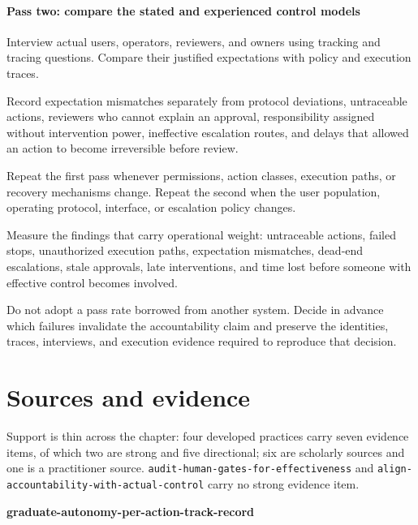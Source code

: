 \hypertarget{pass-two-compare-the-stated-and-experienced-control-models}{%
\paragraph{Pass two: compare the stated and experienced control models}\label{pass-two-compare-the-stated-and-experienced-control-models}}

Interview actual users, operators, reviewers, and owners using tracking and tracing questions. Compare their justified expectations with policy and execution traces.

Record expectation mismatches separately from protocol deviations, untraceable actions, reviewers who cannot explain an approval, responsibility assigned without intervention power, ineffective escalation routes, and delays that allowed an action to become irreversible before review.

Repeat the first pass whenever permissions, action classes, execution paths, or recovery mechanisms change. Repeat the second when the user population, operating protocol, interface, or escalation policy changes.

Measure the findings that carry operational weight: untraceable actions, failed stops, unauthorized execution paths, expectation mismatches, dead-end escalations, stale approvals, late interventions, and time lost before someone with effective control becomes involved.

Do not adopt a pass rate borrowed from another system. Decide in advance which failures invalidate the accountability claim and preserve the identities, traces, interviews, and execution evidence required to reproduce that decision.

\section*{Sources and evidence}

Support is thin across the chapter: four developed practices carry seven evidence items, of which two are strong and five directional; six are scholarly sources and one is a practitioner source. \texttt{audit-human-gates-for-effectiveness} and \texttt{align-accountability-with-actual-control} carry no strong evidence item.

\textbf{graduate-autonomy-per-action-track-record}

